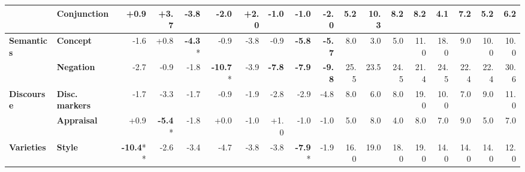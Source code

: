 \begin{table}[h]
{\begin{tabular}{llrrrrrrrrrrrrrrrr}
  & \textbf{Conjunction} & \cellcolor{green!1} +0.9 & \cellcolor{green!7} +3.7 & \cellcolor{red!7} -3.8 & \cellcolor{red!3} -2.0 & \cellcolor{green!3} +2.0 & \cellcolor{red!1} -1.0 & \cellcolor{red!2} -1.0 & \cellcolor{red!4} -2.0 & \cellcolor{blue!1} 5.2 & \cellcolor{blue!2} 10.3 & \cellcolor{blue!1} 8.2 & \cellcolor{blue!1} 8.2 & \cellcolor{blue!0} 4.1 & \cellcolor{blue!1} 7.2 & \cellcolor{blue!1} 5.2 & \cellcolor{blue!1} 6.2 \\
\midrule
\textbf{Semantics} & \textbf{Concept} & \cellcolor{red!3} -1.6 & \cellcolor{green!1} +0.8 & \cellcolor{red!8} \textbf{-4.3}* & \cellcolor{red!1} -0.9 & \cellcolor{red!7} -3.8 & \cellcolor{red!1} -0.9 & \cellcolor{red!11} \textbf{-5.8} & \cellcolor{red!11} \textbf{-5.7} & \cellcolor{blue!1} 8.0 & \cellcolor{blue!0} 3.0 & \cellcolor{blue!1} 5.0 & \cellcolor{blue!2} 11.0 & \cellcolor{blue!3} 18.0 & \cellcolor{blue!1} 9.0 & \cellcolor{blue!2} 10.0 & \cellcolor{blue!2} 10.0 \\
  & \textbf{Negation} & \cellcolor{red!5} -2.7 & \cellcolor{red!1} -0.9 & \cellcolor{red!3} -1.8 & \cellcolor{red!20} \textbf{-10.7}* & \cellcolor{red!7} -3.9 & \cellcolor{red!15} \textbf{-7.8} & \cellcolor{red!15} \textbf{-7.9} & \cellcolor{red!19} \textbf{-9.8} & \cellcolor{blue!5} 25.5 & \cellcolor{blue!4} 23.5 & \cellcolor{blue!4} 24.5 & \cellcolor{blue!4} 21.4 & \cellcolor{blue!4} 24.5 & \cellcolor{blue!4} 22.4 & \cellcolor{blue!4} 22.4 & \cellcolor{blue!6} 30.6 \\
\midrule
\textbf{Discourse} & \textbf{Disc. markers} & \cellcolor{red!3} -1.7 & \cellcolor{red!6} -3.3 & \cellcolor{red!3} -1.7 & \cellcolor{red!1} -0.9 & \cellcolor{red!3} -1.9 & \cellcolor{red!5} -2.8 & \cellcolor{red!5} -2.9 & \cellcolor{red!9} -4.8 & \cellcolor{blue!1} 8.0 & \cellcolor{blue!1} 6.0 & \cellcolor{blue!1} 8.0 & \cellcolor{blue!3} 19.0 & \cellcolor{blue!2} 10.0 & \cellcolor{blue!1} 7.0 & \cellcolor{blue!1} 9.0 & \cellcolor{blue!2} 11.0 \\
  & \textbf{Appraisal} & \cellcolor{green!1} +0.9 & \cellcolor{red!10} \textbf{-5.4}* & \cellcolor{red!3} -1.8 & \cellcolor{red!0} +0.0 & \cellcolor{red!1} -1.0 & \cellcolor{green!1} +1.0 & \cellcolor{red!1} -1.0 & \cellcolor{red!1} -1.0 & \cellcolor{blue!1} 5.0 & \cellcolor{blue!1} 8.0 & \cellcolor{blue!0} 4.0 & \cellcolor{blue!1} 8.0 & \cellcolor{blue!1} 7.0 & \cellcolor{blue!1} 9.0 & \cellcolor{blue!1} 5.0 & \cellcolor{blue!1} 7.0 \\
\midrule
\textbf{Varieties} & \textbf{Style} & \cellcolor{red!20} \textbf{-10.4}** & \cellcolor{red!5} -2.6 & \cellcolor{red!6} -3.4 & \cellcolor{red!9} -4.7 & \cellcolor{red!7} -3.8 & \cellcolor{red!7} -3.8 & \cellcolor{red!15} \textbf{-7.9}* & \cellcolor{red!3} -1.9 & \cellcolor{blue!3} 16.0 & \cellcolor{blue!3} 19.0 & \cellcolor{blue!3} 18.0 & \cellcolor{blue!3} 19.0 & \cellcolor{blue!2} 14.0 & \cellcolor{blue!2} 14.0 & \cellcolor{blue!2} 14.0 & \cellcolor{blue!2} 12.0 \\

\end{tabular}}
\end{table}
